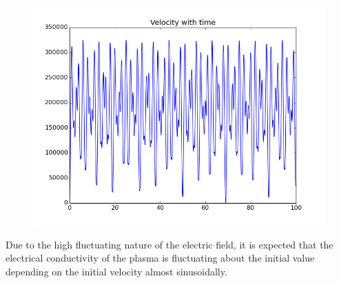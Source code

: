 \documentclass[11pt, a4paper]{article}
\begin{document}
\begin{figure}[H]
 \centering
 \includegraphics[width = \textwidth]{q2b_vel.png}
\end{figure}
Due to the high fluctuating nature of the electric field, it is expected that the electrical conductivity of the plasma is fluctuating about the initial value depending on the initial velocity almost sinusoidally. \\
\end{document}
